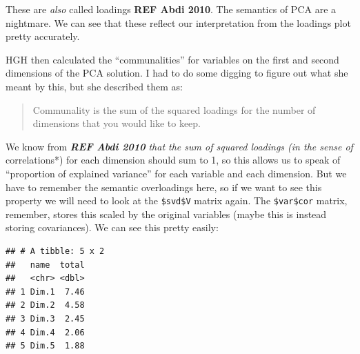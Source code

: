 \documentclass[
]{book}
\newenvironment{Shaded}{\begin{snugshade}}{\end{snugshade}}
\newcommand{\AttributeTok}[1]{\textcolor[rgb]{0.13,0.29,0.53}{#1}}
\newcommand{\CommentTok}[1]{\textcolor[rgb]{0.56,0.35,0.01}{\textit{#1}}}
\newcommand{\DecValTok}[1]{\textcolor[rgb]{0.00,0.00,0.81}{#1}}
\newcommand{\FunctionTok}[1]{\textcolor[rgb]{0.13,0.29,0.53}{\textbf{#1}}}
\newcommand{\NormalTok}[1]{#1}
\newcommand{\SpecialCharTok}[1]{\textcolor[rgb]{0.81,0.36,0.00}{\textbf{#1}}}
\newcommand{\StringTok}[1]{\textcolor[rgb]{0.31,0.60,0.02}{#1}}
\begin{document}
These are \emph{also} called loadings \textbf{REF Abdi 2010}. The semantics of PCA are a nightmare. We can see that these reflect our interpretation from the loadings plot pretty accurately.

HGH then calculated the ``communalities'' for variables on the first and second dimensions of the PCA solution. I had to do some digging to figure out what she meant by this, but she described them as:

\begin{quote}
Communality is the sum of the squared loadings for the number of dimensions that you would like to keep.
\end{quote}

We know from \emph{\textbf{REF Abdi 2010} that the sum of squared loadings (in the sense of }correlations*) for each dimension should sum to 1, so this allows us to speak of ``proportion of explained variance'' for each variable and each dimension. But we have to remember the semantic overloadings here, so if we want to see this property we will need to look at the \texttt{\$svd\$V} matrix again. The \texttt{\$var\$cor} matrix, remember, stores this scaled by the original variables (maybe this is instead storing covariances). We can see this pretty easily:

\begin{Shaded}
\end{Shaded}

\begin{verbatim}
## # A tibble: 5 x 2
##   name  total
##   <chr> <dbl>
## 1 Dim.1  7.46
## 2 Dim.2  4.58
## 3 Dim.3  2.45
## 4 Dim.4  2.06
## 5 Dim.5  1.88
\end{verbatim}
\end{document}
